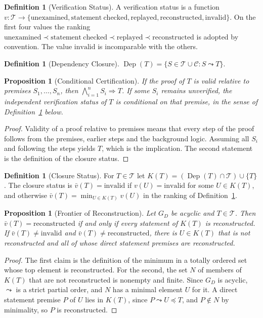 \documentclass[11pt,letterpaper]{report}
\theoremstyle{plain}
\newtheorem{proposition}[theorem]{Proposition}
\theoremstyle{definition}
\newtheorem{definition}[theorem]{Definition}
\theoremstyle{remark}
\begin{document}
\begin{definition}[Verification Status]\label{def:vstatus}
A verification status is a function $v:\mathcal T\to\{\mathrm{unexamined},\mathrm{statement\ checked},\mathrm{replayed},\mathrm{reconstructed},\mathrm{invalid}\}$. On the first four values the ranking $\mathrm{unexamined}\prec\mathrm{statement\ checked}\prec\mathrm{replayed}\prec\mathrm{reconstructed}$ is adopted by convention. The value $\mathrm{invalid}$ is incomparable with the others.
\end{definition}

\begin{definition}[Dependency Closure]\label{def:depclosure}
$\operatorname{Dep}(T)=\{S\in\mathcal T\cup\mathcal C:S\leadsto T\}$.
\end{definition}

\begin{proposition}[Conditional Certification]\label{pr:condcert}
If the proof of $T$ is valid relative to premises $S_1,\dots,S_n$, then $\bigwedge_{i=1}^nS_i\Rightarrow T$. If some $S_i$ remains unverified, the independent verification status of $T$ is conditional on that premise, in the sense of Definition~\ref{def:closurestatus} below.
\end{proposition}
\begin{proof}
Validity of a proof relative to premises means that every step of the proof follows from the premises, earlier steps and the background logic. Assuming all $S_i$ and following the steps yields $T$, which is the implication. The second statement is the definition of the closure status.
\end{proof}

\begin{definition}[Closure Status]\label{def:closurestatus}
For $T\in\mathcal T$ let $K(T)=(\operatorname{Dep}(T)\cap\mathcal T)\cup\{T\}$. The closure status is $\bar v(T)=\mathrm{invalid}$ if $v(U)=\mathrm{invalid}$ for some $U\in K(T)$, and otherwise $\bar v(T)=\min_{U\in K(T)}v(U)$ in the ranking of Definition~\ref{def:vstatus}.
\end{definition}

\begin{proposition}[Frontier of Reconstruction]\label{pr:frontier}
Let $G_D$ be acyclic and $T\in\mathcal T$. Then $\bar v(T)=\mathrm{reconstructed}$ if and only if every statement of $K(T)$ is reconstructed. If $\bar v(T)\ne\mathrm{invalid}$ and $\bar v(T)\ne\mathrm{reconstructed}$, there is $U\in K(T)$ that is not reconstructed and all of whose direct statement premises are reconstructed.
\end{proposition}
\begin{proof}
The first claim is the definition of the minimum in a totally ordered set whose top element is reconstructed. For the second, the set $N$ of members of $K(T)$ that are not reconstructed is nonempty and finite. Since $G_D$ is acyclic, $\leadsto$ is a strict partial order, and $N$ has a minimal element $U$ for it. A direct statement premise $P$ of $U$ lies in $K(T)$, since $P\leadsto U\preceq T$, and $P\notin N$ by minimality, so $P$ is reconstructed.
\end{proof}
\end{document}
